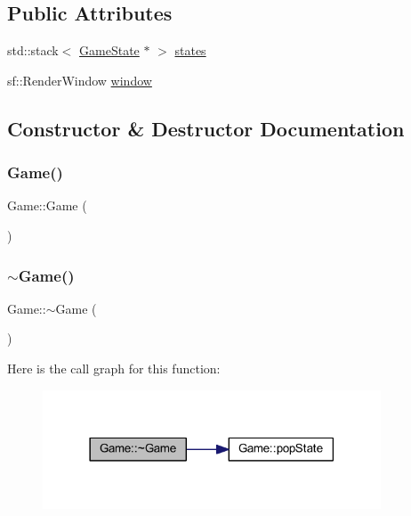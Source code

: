 \subsection*{Public Attributes}
\begin{DoxyCompactItemize}
\item 
std\+::stack$<$ \hyperlink{class_game_state}{Game\+State} $\ast$ $>$ \hyperlink{class_game_afb615f4fb6621cd14769c14716f4b0a5}{states}
\item 
sf\+::\+Render\+Window \hyperlink{class_game_a223de215aeb661cd423ac145756cc730}{window}
\end{DoxyCompactItemize}


\subsection{Constructor \& Destructor Documentation}
\mbox{\label{class_game_ad59df6562a58a614fda24622d3715b65}} 
\subsubsection{\texorpdfstring{Game()}{Game()}}
{\footnotesize\ttfamily Game\+::\+Game (\begin{DoxyParamCaption}{ }\end{DoxyParamCaption})}

\mbox{\label{class_game_ae3d112ca6e0e55150d2fdbc704474530}} 
\subsubsection{\texorpdfstring{$\sim$\+Game()}{~Game()}}
{\footnotesize\ttfamily Game\+::$\sim$\+Game (\begin{DoxyParamCaption}{ }\end{DoxyParamCaption})}

Here is the call graph for this function\+:
\nopagebreak
\begin{figure}[H]
\begin{center}
\leavevmode
\includegraphics[width=285pt]{class_game_ae3d112ca6e0e55150d2fdbc704474530_cgraph}
\end{center}
\end{figure}


